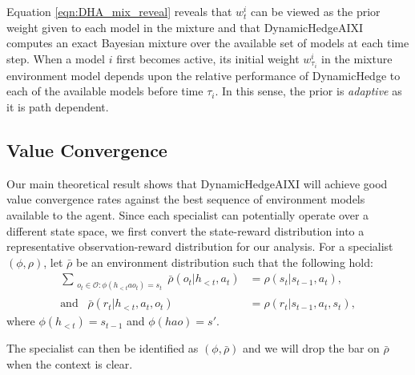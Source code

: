\documentclass[letterpaper]{article} %
\newcommand {\Obs}{\mathcal{O}}
\newcommand{\abs}[1]{\lvert #1 \rvert}
\theoremstyle{definition}
\begin{document}
Equation \ref{eqn:DHA_mix_reveal} reveals that $w_{t}^{i}$ can be viewed as the prior weight given to each model in the mixture and that DynamicHedgeAIXI computes an exact Bayesian mixture over the available set of models at each time step.
When a model $i$ first becomes active, its initial weight $w_{\tau_i}^i$ in the mixture environment model depends upon the relative performance of DynamicHedge to each of the available models before time $\tau_i$. 
In this sense, the prior is \textit{adaptive} as it is path dependent.


\subsection{Value Convergence} 
Our main theoretical result shows that DynamicHedgeAIXI will achieve good value convergence rates against the best sequence of environment models available to the agent. 
Since each specialist can potentially operate over a different state space, we first convert the state-reward distribution into a representative observation-reward distribution for our analysis. For a specialist $(\phi, \rho)$, let $\bar{\rho}$ be an environment distribution such that the following hold:
\begin{align*}
    \sum_{\substack{o_t \in \mathcal{\Obs}:\phi(h_{<t}ao_t) = s_t}} \bar{\rho}(o_t | h_{<t}, a_t) &= \rho(s_{t} | s_{t-1}, a_t), \\
    \text{and}\;\;\; \bar{\rho}(r_t | h_{<t}, a_t, o_t) &= \rho(r_t | s_{t-1}, a_t, s_{t}),
\end{align*}
where $\phi(h_{<t}) = s_{t-1}$ and $\phi(hao) = s'$. 

The specialist can then be identified as $(\phi, \bar{\rho})$ and we will drop the bar on $\bar{\rho}$ when the context is clear. 
\end{document}
